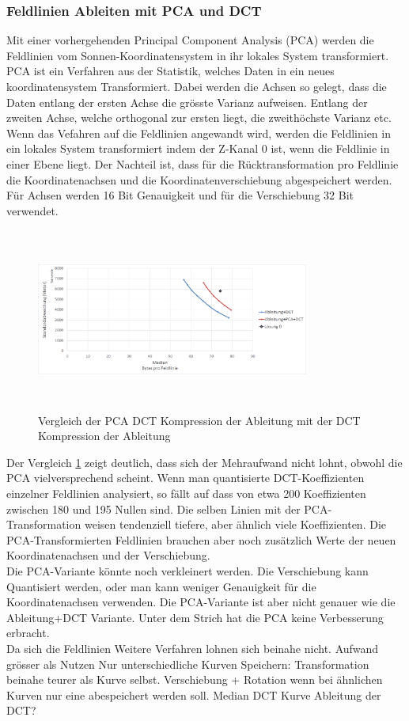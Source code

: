 \subsubsection{Feldlinien Ableiten mit PCA und DCT}
Mit einer vorhergehenden Principal Component Analysis (PCA) \cite{abdi2010principal} werden die Feldlinien vom Sonnen-Koordinatensystem in ihr lokales System transformiert. 
PCA ist ein Verfahren aus der Statistik, welches Daten in ein neues koordinatensystem Transformiert. Dabei werden die Achsen so gelegt, dass die Daten entlang der ersten Achse die grösste Varianz aufweisen. Entlang der zweiten Achse, welche orthogonal zur ersten liegt, die zweithöchste Varianz etc. Wenn das Vefahren auf die Feldlinien angewandt wird, werden die Feldlinien in ein lokales System transformiert indem der Z-Kanal 0 ist, wenn die Feldlinie in einer Ebene liegt. Der Nachteil ist, dass für die Rücktransformation pro Feldlinie die Koordinatenachsen und die Koordinatenverschiebung abgespeichert werden. Für Achsen werden 16 Bit Genauigkeit und für die Verschiebung 32 Bit verwendet.
\begin{figure}[!htbp]
	\center
	\includegraphics[width=0.8\textwidth,height=6cm,keepaspectratio]{./pictures/resultate/loesung1/loesung1-4/loesung1_4.png}
	\caption{Vergleich der PCA DCT Kompression der Ableitung mit der DCT Kompression der Ableitung}
	\label{resultate:loesung1:dct:pca}
\end{figure}
Der Vergleich \ref{resultate:loesung1:dct:pca} zeigt deutlich, dass sich der Mehraufwand nicht lohnt, obwohl die PCA vielversprechend scheint. Wenn man quantisierte DCT-Koeffizienten einzelner Feldlinien analysiert, so fällt auf dass von etwa 200 Koeffizienten zwischen 180 und 195 Nullen sind. Die selben Linien mit der PCA-Transformation weisen tendenziell tiefere, aber ähnlich viele Koeffizienten. Die PCA-Transformierten Feldlinien brauchen aber noch zusätzlich Werte der neuen Koordinatenachsen und der Verschiebung.\\
Die PCA-Variante könnte noch verkleinert werden. Die Verschiebung kann Quantisiert werden, oder man kann weniger Genauigkeit für die Koordinatenachsen verwenden. Die PCA-Variante ist aber nicht genauer wie die Ableitung+DCT Variante. Unter dem Strich hat die PCA keine Verbesserung erbracht.\\
[\baselineskip]
Da sich die Feldlinien
Weitere Verfahren lohnen sich beinahe nicht. Aufwand grösser als Nutzen
Nur unterschiedliche Kurven Speichern: Transformation beinahe teurer als Kurve selbst. Verschiebung + Rotation wenn bei ähnlichen Kurven nur eine abespeichert werden soll.
Median DCT Kurve
Ableitung der DCT?

